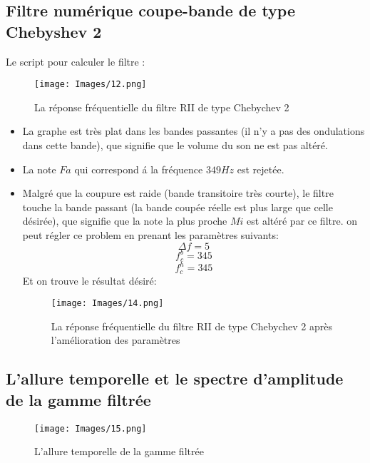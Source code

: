 \documentclass[twoside,twocolumn]{article}
\begin{document}
\subsection{Filtre numérique coupe-bande de type Chebyshev 2}
Le script pour calculer le filtre :
\label{matlab}



\begin{figure}[H]
\centering
\texttt{[image: Images/12.png]}
\caption{ La réponse fréquentielle du filtre RII de type Chebychev 2}
\end{figure}
\begin{itemize}
\item
La graphe est très plat dans les bandes passantes (il n'y a pas des ondulations dans cette bande), que signifie que le volume du son ne est pas altéré.
\item La note $Fa$ qui correspond á la fréquence $349 Hz$ est rejetée.
\item 
Malgré que la coupure est raide (bande transitoire très courte), le filtre touche la bande passant (la bande coupée réelle est plus large que celle désirée), que signifie que la note la plus proche $Mi$ est altéré par ce filtre. on peut régler ce problem en prenant les paramètres suivants:\\
$$\Delta f = 5$$
$$ f_c^b = 345 $$ 
$$ f_c^h = 345 $$ 
 Et on trouve le résultat désiré:
\begin{figure}[H]
\centering
\texttt{[image: Images/14.png]}
\caption{ La réponse fréquentielle du filtre RII de type Chebychev 2 après l'amélioration des paramètres}
\end{figure}

\end{itemize}

\subsection{L'allure temporelle et le spectre d'amplitude de la gamme filtrée}

\label{matlab}


\begin{figure}[H]
\centering
\texttt{[image: Images/15.png]}
\caption{ L'allure temporelle de la gamme filtrée}
\end{figure}
\end{document}
